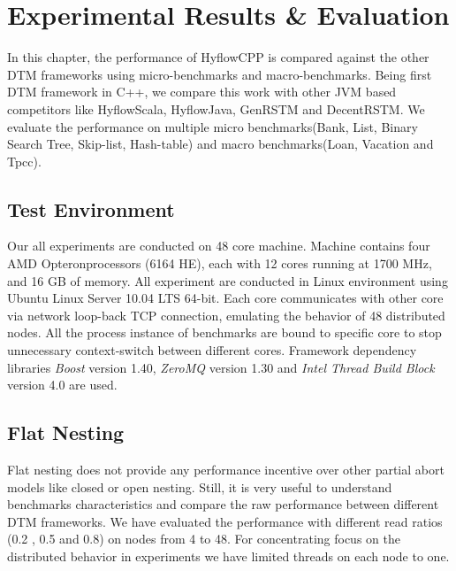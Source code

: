 \documentclass[12pt,english]{report}
\begin{document}
\chapter{Experimental Results \& Evaluation}\label{chap:expResults}

In this chapter, the performance of HyflowCPP is compared against the other DTM frameworks using micro-benchmarks and macro-benchmarks. Being first DTM framework in C++, we compare this work with other JVM based competitors like HyflowScala, HyflowJava, GenRSTM and DecentRSTM. We evaluate the performance on multiple micro benchmarks(Bank, List, Binary Search Tree, Skip-list, Hash-table) and  macro benchmarks(Loan, Vacation and Tpcc).   

\section{Test Environment}

Our all experiments are conducted on 48 core machine. Machine contains four AMD Opteron\texttrademark  processors (6164 HE), each with 12 cores running at 1700 MHz, and 16 GB of memory. All experiment are conducted in Linux environment using Ubuntu Linux Server 10.04 LTS 64-bit.  Each core communicates with other core via network loop-back TCP connection, emulating the behavior of 48 distributed nodes. All the process instance of benchmarks are bound to specific core to stop unnecessary context-switch between different cores. Framework dependency libraries \textit{Boost} version 1.40, \textit{ZeroMQ} version 1.30 and \textit{Intel Thread Build Block} version 4.0 are used.  

\section{Flat Nesting}

Flat nesting does not provide any performance incentive over other partial abort models like closed or open nesting. Still, it is very useful to understand benchmarks characteristics and compare the raw performance between different DTM frameworks. We have evaluated the performance with different read ratios (0.2 , 0.5 and 0.8) on nodes from 4 to 48. For concentrating focus on the distributed behavior in experiments we have limited threads on each node to one.  
\end{document}
